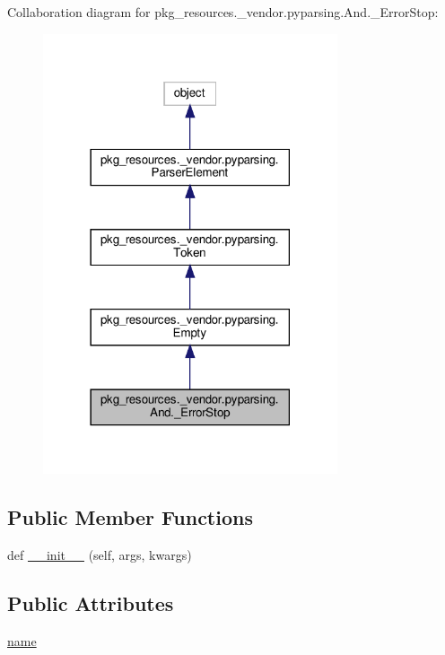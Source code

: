 Collaboration diagram for pkg\+\_\+resources.\+\_\+vendor.\+pyparsing.\+And.\+\_\+\+Error\+Stop\+:
\nopagebreak
\begin{figure}[H]
\begin{center}
\leavevmode
\includegraphics[width=246pt]{classpkg__resources_1_1__vendor_1_1pyparsing_1_1And_1_1__ErrorStop__coll__graph}
\end{center}
\end{figure}
\subsection*{Public Member Functions}
\begin{DoxyCompactItemize}
\item 
def \hyperlink{classpkg__resources_1_1__vendor_1_1pyparsing_1_1And_1_1__ErrorStop_a332d54174e10c8ecf9c328ba395cab14}{\+\_\+\+\_\+init\+\_\+\+\_\+} (self, args, kwargs)
\end{DoxyCompactItemize}
\subsection*{Public Attributes}
\begin{DoxyCompactItemize}
\item 
\hyperlink{classpkg__resources_1_1__vendor_1_1pyparsing_1_1And_1_1__ErrorStop_a424f6e8180b4d33396c48f8bca657631}{name}
\end{DoxyCompactItemize}
